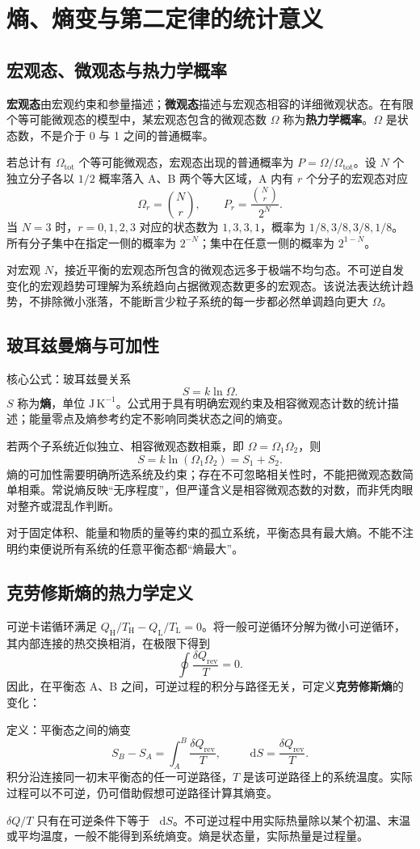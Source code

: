 \documentclass[UTF8,fontset=none,zihao=-4,a4paper]{ctexart}
\newcommand{\chapterpage}[1]{\clearpage\section{#1}}
\newcommand{\term}[1]{\textbf{#1}}
\newcommand{\dd}{\mathop{}\!\mathrm{d}}
\begin{document}
\chapterpage{熵、熵变与第二定律的统计意义}
\subsection{宏观态、微观态与热力学概率}
\term{宏观态}由宏观约束和参量描述；\term{微观态}描述与宏观态相容的详细微观状态。在有限个等可能微观态的模型中，某宏观态包含的微观态数 $\Omega$ 称为\term{热力学概率}。$\Omega$ 是状态数，不是介于 0 与 1 之间的普通概率。

若总计有 $\Omega_{\mathrm{tot}}$ 个等可能微观态，宏观态出现的普通概率为 $P=\Omega/\Omega_{\mathrm{tot}}$。设 $N$ 个独立分子各以 $1/2$ 概率落入 A、B 两个等大区域，A 内有 $r$ 个分子的宏观态对应
\[
 \Omega_r=\binom Nr,\qquad
 P_r=\frac{\binom Nr}{2^N}.
\]
当 $N=3$ 时，$r=0,1,2,3$ 对应的状态数为 $1,3,3,1$，概率为 $1/8,3/8,3/8,1/8$。所有分子集中在指定一侧的概率为 $2^{-N}$；集中在任意一侧的概率为 $2^{1-N}$。

对宏观 $N$，接近平衡的宏观态所包含的微观态远多于极端不均匀态。不可逆自发变化的宏观趋势可理解为系统趋向占据微观态数更多的宏观态。该说法表达统计趋势，不排除微小涨落，不能断言少粒子系统的每一步都必然单调趋向更大 $\Omega$。

\subsection{玻耳兹曼熵与可加性}
\begin{infobox}{核心公式：玻耳兹曼关系}
\[
 S=k\ln\Omega.
\]
$S$ 称为\term{熵}，单位 $\mathrm{J\,K^{-1}}$。公式用于具有明确宏观约束及相容微观态计数的统计描述；能量零点及熵参考约定不影响同类状态之间的熵变。
\end{infobox}
若两个子系统近似独立、相容微观态数相乘，即 $\Omega=\Omega_1\Omega_2$，则
\[
 S=k\ln(\Omega_1\Omega_2)=S_1+S_2.
\]
熵的可加性需要明确所选系统及约束；存在不可忽略相关性时，不能把微观态数简单相乘。常说熵反映“无序程度”，但严谨含义是相容微观态数的对数，而非凭肉眼对整齐或混乱作判断。

对于固定体积、能量和物质的量等约束的孤立系统，平衡态具有最大熵。不能不注明约束便说所有系统的任意平衡态都“熵最大”。

\subsection{克劳修斯熵的热力学定义}
可逆卡诺循环满足 $Q_{\mathrm H}/T_{\mathrm H}-Q_{\mathrm L}/T_{\mathrm L}=0$。将一般可逆循环分解为微小可逆循环，其内部连接的热交换相消，在极限下得到
\[
 \oint\frac{\delta Q_{\mathrm{rev}}}{T}=0.
\]
因此，在平衡态 A、B 之间，可逆过程的积分与路径无关，可定义\term{克劳修斯熵}的变化：
\begin{infobox}{定义：平衡态之间的熵变}
\[
 S_B-S_A=\int_A^B\frac{\delta Q_{\mathrm{rev}}}{T},
 \qquad \dd S=\frac{\delta Q_{\mathrm{rev}}}{T}.
\]
积分沿连接同一初末平衡态的任一可逆路径，$T$ 是该可逆路径上的系统温度。实际过程可以不可逆，仍可借助假想可逆路径计算其熵变。
\end{infobox}
$\delta Q/T$ 只有在可逆条件下等于 $\dd S$。不可逆过程中用实际热量除以某个初温、末温或平均温度，一般不能得到系统熵变。熵是状态量，实际热量是过程量。
\end{document}
